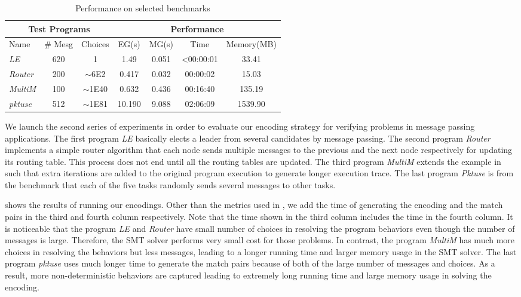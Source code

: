 \begin{table}
\begin{center}
\setlength{\tabcolsep}{2pt}
\scriptsize
\caption{Performance on selected benchmarks}
\begin{tabular}{|l|c|c|c|c|c|c|}
		\hline
         \multicolumn{3}{|c|}{Test Programs} & \multicolumn{4}{|c|}{Performance} \\ \hline
         Name & \# Mesg & Choices & EG(s) & MG(s) & Time & Memory(MB) \\ \hline
         \textit{LE} & 620 & 1 & 1.49 & 0.051 & <00:00:01 & 33.41  \\ %
         \textit{Router} & 200 & $\sim$6E2 & 0.417 & 0.032 & 00:00:02 & 15.03  \\ %
         \textit{MultiM} & 100 & $\sim$1E40 & 0.632 & 0.436 &  00:16:40 & 135.19  \\ %
         \textit{pktuse} & 512 & $\sim$1E81 & 10.190 & 9.088 & 02:06:09 & 1539.90 \\ %
         \hline
		\end{tabular}
\end{center}
\label{table:second}
\end{table}
We launch the second series of experiments in order to evaluate our encoding strategy for verifying problems in message passing applications. The first program \textit{LE} basically elects a leader from several candidates by message passing. The second program \textit{Router} implements a simple router algorithm that each node sends multiple messages to the previous and the next node respectively for updating its routing table. This process does not end until all the routing tables are updated. The third program \textit{MultiM} extends the example in  such that extra iterations are added to the original program execution to generate longer execution trace. The last program \textit{Pktuse} is from the benchmark \cite{mpptest_benchmark} that each of the five tasks randomly sends several messages to other tasks.

 shows the results of running our encodings. Other than the metrics used in , we add the time of generating the encoding and the match pairs in the third and fourth column respectively. Note that the time shown in the third column includes the time in the fourth column. It is noticeable that the program \textit{LE} and \textit{Router} have small number of choices in resolving the program behaviors even though the number of messages is large. Therefore, the SMT solver performs very small cost for those problems. In contrast, the program \textit{MultiM} has much more choices in resolving the behaviors but less messages, leading to a longer running time and larger memory usage in the SMT solver. The last program \textit{pktuse} uses much longer time to generate the match pairs because of both of the large number of messages and choices. As a result, more non-deterministic behaviors are captured leading to extremely long running time and large memory usage in solving the encoding.

